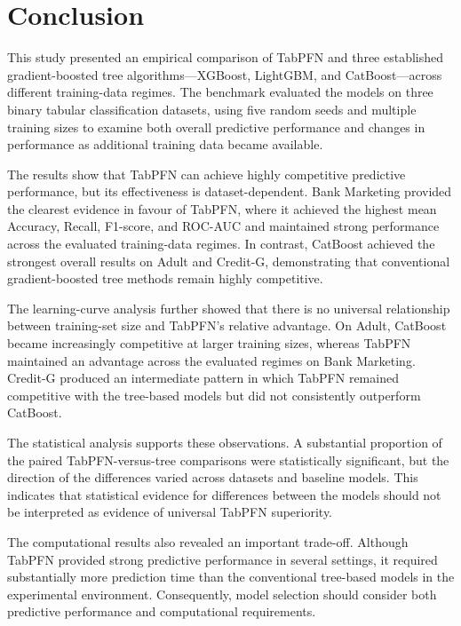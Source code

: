 \section{Conclusion}\label{conclusion}

This study presented an empirical comparison of TabPFN and three established gradient-boosted tree algorithms---XGBoost, LightGBM, and CatBoost---across different training-data regimes. The benchmark evaluated the models on three binary tabular classification datasets, using five random seeds and multiple training sizes to examine both overall predictive performance and changes in performance as additional training data became available.

The results show that TabPFN can achieve highly competitive predictive performance, but its effectiveness is dataset-dependent. Bank Marketing provided the clearest evidence in favour of TabPFN, where it achieved the highest mean Accuracy, Recall, F1-score, and ROC-AUC and maintained strong performance across the evaluated training-data regimes. In contrast, CatBoost achieved the strongest overall results on Adult and Credit-G, demonstrating that conventional gradient-boosted tree methods remain highly competitive.

The learning-curve analysis further showed that there is no universal relationship between training-set size and TabPFN's relative advantage. On Adult, CatBoost became increasingly competitive at larger training sizes, whereas TabPFN maintained an advantage across the evaluated regimes on Bank Marketing. Credit-G produced an intermediate pattern in which TabPFN remained competitive with the tree-based models but did not consistently outperform CatBoost.

The statistical analysis supports these observations. A substantial proportion of the paired TabPFN-versus-tree comparisons were statistically significant, but the direction of the differences varied across datasets and baseline models. This indicates that statistical evidence for differences between the models should not be interpreted as evidence of universal TabPFN superiority.

The computational results also revealed an important trade-off. Although TabPFN provided strong predictive performance in several settings, it required substantially more prediction time than the conventional tree-based models in the experimental environment. Consequently, model selection should consider both predictive performance and computational requirements.


